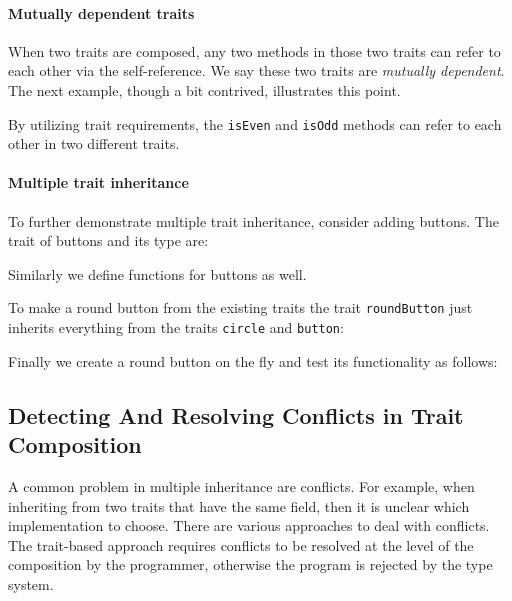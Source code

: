 
\paragraph{Mutually dependent traits} When two traits are composed, any two
methods in those two traits can refer to each other via the self-reference. We
say these two traits are \textit{mutually dependent}. The next example, though a
bit contrived, illustrates this point.

\noindent By utilizing trait requirements, the \lstinline{isEven} and
\lstinline{isOdd} methods can refer to each other in two different traits.


\paragraph{Multiple trait inheritance} To further demonstrate multiple
trait inheritance, consider adding buttons. The trait of buttons and its type are:

Similarly we define functions for buttons as well.

\noindent To make a round button from the existing traits the trait
\lstinline{roundButton} just inherits everything from the traits
\lstinline{circle} and \lstinline{button}:

\noindent Finally we create a round button on the fly and test its functionality
as follows:

\subsection{Detecting And Resolving Conflicts in Trait Composition}
\label{sec:conflicts}

A common problem in multiple inheritance are conflicts. For example, when
inheriting from two traits that have the same field, then it is unclear which
implementation to choose. There are various approaches to deal with conflicts.
The trait-based approach requires conflicts to be resolved at the level of the
composition by the programmer, otherwise the program is rejected by the type
system.


